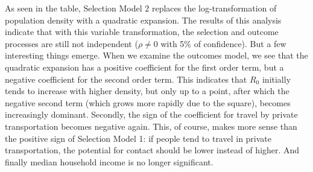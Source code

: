 \documentclass[10pt,letterpaper]{article}
\begin{document}
As seen in the table, Selection Model 2 replaces the log-transformation
of population density with a quadratic expansion. The results of this
analysis indicate that with this variable transformation, the selection
and outcome processes are still not independent (\(\rho\ne0\) with 5\%
of confidence). But a few interesting things emerge. When we examine the
outcomes model, we see that the quadratic expansion has a positive
coefficient for the first order term, but a negative coefficient for the
second order term. This indicates that \(R_0\) initially tends to
increase with higher density, but only up to a point, after which the
negative second term (which grows more rapidly due to the square),
becomes increasingly dominant. Secondly, the sign of the coefficient for
travel by private transportation becomes negative again. This, of
course, makes more sense than the positive sign of Selection Model 1: if
people tend to travel in private transportation, the potential for
contact should be lower instead of higher. And finally median household
income is no longer significant.
\end{document}
